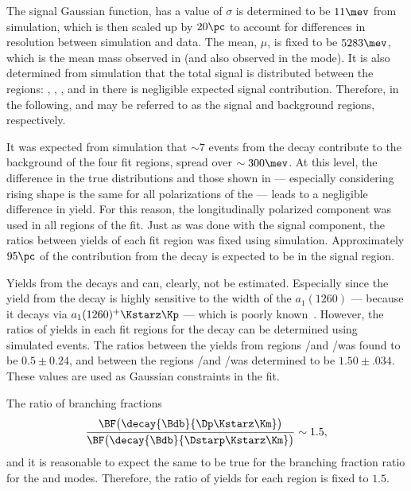 The signal Gaussian function,
has a value of $\sigma$ is determined to be $11\mev$ from simulation, which is then scaled up by
$20\pc$ to account for differences in resolution between simulation and data.
The mean, $\mu$, is fixed to be $5283\mev$, which is the mean mass observed in
\decay{\Bp}{\Dz\pip} (and also observed in the \Bs mode).
It is also determined from simulation that the total signal is distributed between the regions:
\pc, \pc, \pc, and in \rD there is negligible expected signal contribution.
Therefore, in the following, \rA and \rD may be referred to as the signal and background regions,
respectively.

It was expected from simulation that $\sim7$ events from the decay \btodsstrphi contribute to the
background of the four fit regions, spread over $\sim300\mev$.
At this level, the difference in the true distributions and those shown in 
--- especially considering rising shape is the same for all polarizations of the \phii ---
leads to a negligible difference in yield.
For this reason, the longitudinally polarized \btodsstrphi component was used in all regions of the
fit.
Just as was done with the signal component, the ratios between yields of each fit region was fixed
using simulation.
Approximately $95\pc$ of the contribution from the decay \btodsstrphi is expected to be in the
signal region.

Yields from the decays \bstodskstrk and \bstodsstrkstrk can, clearly, not be estimated.
Especially since the yield from the decay \bstodskstrk is highly sensitive to the width of the
$a_1(1260)$ --- because it decays via $a_1(1260)^+\Kstarz\Kp$ --- which is poorly
known~\cite{PDG2012}.
However, the ratios of yields in each fit regions for the decay \bstodskstrk can be determined
using simulated events.
The ratios between the yields from regions \rA/\rB and \rC/\rD was found to be $0.5\pm0.24$, and
between the regions \rA/\rC and \rB/\rD was determined to be $1.50\pm.034$.
These values are used as Gaussian constraints in the fit.

The ratio of branching fractions
\begin{equation}
  \frac{\BF\big(\decay{\Bdb}{\Dp\Kstarz\Km}\big)}
  {\BF\big(\decay{\Bdb}{\Dstarp\Kstarz\Km}\big)}
  \sim 1.5,
\end{equation}
and it is reasonable to expect the same to be true for the branching fraction ratio for the
\bstodskstrk and \bstodsstrkstrk modes.
Therefore, the ratio of yields for each region is fixed to $1.5$.

